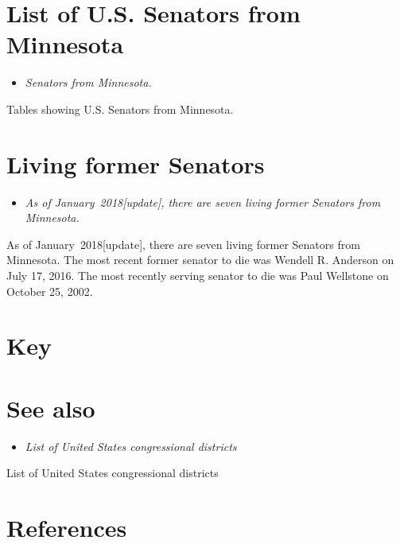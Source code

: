 \section{List of U.S. Senators from
Minnesota}\label{list-of-u.s.-senators-from-minnesota}

\begin{itemize}
\item
  \emph{Senators from Minnesota.}
\end{itemize}

Tables showing U.S. Senators from Minnesota.

\section{Living former Senators}\label{living-former-senators}

\begin{itemize}
\item
  \emph{As of January~2018{[}update{]}, there are seven living former
  Senators from Minnesota.}
\end{itemize}

As of January~2018{[}update{]}, there are seven living former Senators
from Minnesota. The most recent former senator to die was Wendell R.
Anderson on July 17, 2016. The most recently serving senator to die was
Paul Wellstone on October 25, 2002.

\section{Key}\label{key}

\section{See also}\label{see-also}

\begin{itemize}
\item
  \emph{List of United States congressional districts}
\end{itemize}

List of United States congressional districts

\section{References}\label{references}
